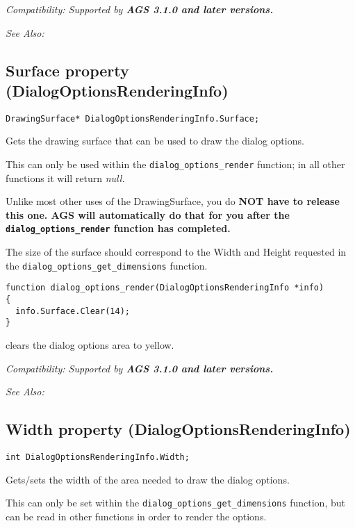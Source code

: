 \it{Compatibility:} Supported by \bf{AGS 3.1.0} and later versions.

\it{See Also:} 


\subsection{Surface property (DialogOptionsRenderingInfo)}\label{DialogOptionsRenderingInfo.Surface}%

\begin{verbatim}
DrawingSurface* DialogOptionsRenderingInfo.Surface;
\end{verbatim}
Gets the drawing surface that can be used to draw the dialog options.

This can only be used within the \verb$dialog_options_render$ function; in all other
functions it will return \it{null}.

Unlike most other uses of the DrawingSurface, you do \bf{NOT} have to release this one.
AGS will automatically do that for you after the \verb$dialog_options_render$ function
has completed.

The size of the surface should correspond to the Width and Height requested in
the \verb$dialog_options_get_dimensions$ function.

\begin{verbatim}
function dialog_options_render(DialogOptionsRenderingInfo *info)
{
  info.Surface.Clear(14);
}
\end{verbatim}
clears the dialog options area to yellow.

\it{Compatibility:} Supported by \bf{AGS 3.1.0} and later versions.

\it{See Also:} 


\subsection{Width property (DialogOptionsRenderingInfo)}\label{DialogOptionsRenderingInfo.Width}%

\begin{verbatim}
int DialogOptionsRenderingInfo.Width;
\end{verbatim}
Gets/sets the width of the area needed to draw the dialog options.

This can only be set within the \verb$dialog_options_get_dimensions$ function, but
can be read in other functions in order to render the options.

